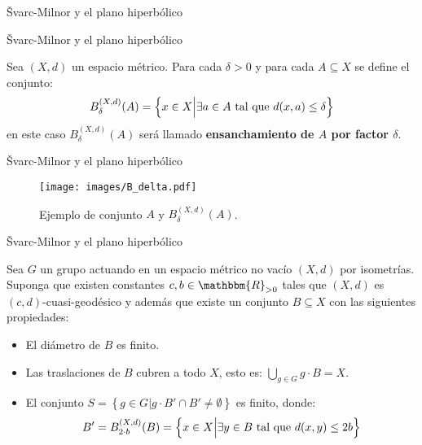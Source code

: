 \documentclass[xcolor=dvipsnames]{beamer}
\theoremstyle{largebreak}
\newcommand{\bbm}[1]{\ensuremath{\mathbbm{#1}}}
\begin{document}
\begin{frame}
    \begin{center}
        \Large Švarc-Milnor y el plano hiperbólico
    \end{center}
\end{frame}

\begin{frame}{Švarc-Milnor y el plano hiperbólico}
    \begin{mydef}
        Sea $(X,d)$ un espacio métrico. Para cada $\delta>0$ y para cada $A\subseteq X$ se define el conjunto:
        \begin{equation*}
            B_\delta^{(X,d)}(A)=\left\{x\in X\Big|\exists a\in A\textup{ tal que }d(x,a)\leq\delta \right\}
        \end{equation*}
        en este caso $B_\delta^{(X,d)}(A)$ será llamado \textbf{ensanchamiento de $A$ por factor $\delta$}.
    \end{mydef}
\end{frame}

\begin{frame}{Švarc-Milnor y el plano hiperbólico}
    \begin{figure}
        \begin{center}
            \texttt{[image: images/B\_delta.pdf]}
        \end{center}
        \caption{Ejemplo de conjunto $A$ y $B_\delta^{(X,d)}(A)$.}
    \end{figure}
\end{frame}

\begin{frame}{Švarc-Milnor y el plano hiperbólico}
    \begin{lema}
        Sea $G$ un grupo actuando en un espacio métrico no vacío $(X,d)$ por isometrías. Suponga que existen constantes $c,b\in\bbm{R}_{>0}$ tales que $(X,d)$ es $(c,d)$-cuasi-geodésico y además que existe un conjunto $B\subseteq X$ con las siguientes propiedades:
        \begin{itemize}
            \item El diámetro de $B$ es finito.
            \item Las traslaciones de $B$ cubren a todo $X$, esto es: $\bigcup_{g\in G}g\cdot B=X$.
            \item El conjunto $S=\left\{g\in G\Big|g\cdot B'\cap B'\neq\emptyset \right\}$ es finito, donde:
            \begin{equation*}
                B'=B_{2\cdot b}^{(X,d)}(B)=\left\{x\in X\Big|\exists y\in B\textup{ tal que }d(x,y)\leq 2b \right\}
            \end{equation*}
        \end{itemize}
    \end{lema}
\end{frame}
\end{document}

